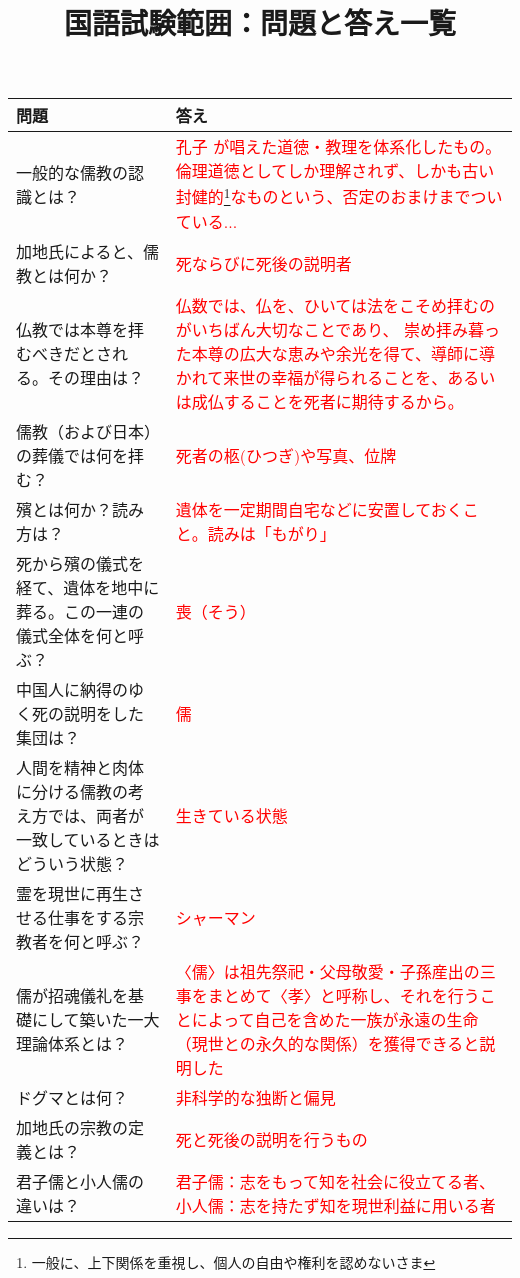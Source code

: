 \documentclass[a4paper,10pt]{article}
\title{国語試験範囲：問題と答え一覧}
\date{}
\begin{document}
\maketitle

\begin{longtable}{|p{}|p{}|}
\hline
\textbf{問題} & \textbf{答え} \\ \hline
一般的な儒教の認識とは？ & \textcolor{red}{孔子 が唱えた道徳・教理を体系化したもの。倫理道徳としてしか理解されず、しかも古い封健的\footnote{一般に、上下関係を重視し、個人の自由や権利を認めないさま}なものという、否定のおまけまでついている...} \\ \hline
加地氏によると、儒教とは何か？ & \textcolor{red}{死ならびに死後の説明者} \\ \hline
仏教では本尊を拝むべきだとされる。その理由は？ & \textcolor{red}{仏数では、仏を、ひいては法をこそめ拝むのがいちばん大切なことであり、
崇め拝み暮った本尊の広大な恵みや余光を得て、導師に導かれて来世の幸福が得られることを、あるいは成仏することを死者に期待するから。} \\ \hline
儒教（および日本）の葬儀では何を拝む？ & \textcolor{red}{死者の柩(ひつぎ)や写真、位牌} \\ \hline
殯とは何か？読み方は？ & \textcolor{red}{遺体を一定期間自宅などに安置しておくこと。読みは「もがり」} \\ \hline
死から殯の儀式を経て、遺体を地中に葬る。この一連の儀式全体を何と呼ぶ？ & \textcolor{red}{喪（そう）} \\ \hline
中国人に納得のゆく死の説明をした集団は？ & \textcolor{red}{儒} \\ \hline
人間を精神と肉体に分ける儒教の考え方では、両者が一致しているときはどういう状態？ & \textcolor{red}{生きている状態} \\ \hline
霊を現世に再生させる仕事をする宗教者を何と呼ぶ？ & \textcolor{red}{シャーマン} \\ \hline
儒が招魂儀礼を基礎にして築いた一大理論体系とは？ & \textcolor{red}{〈儒〉は祖先祭祀・父母敬愛・子孫産出の三事をまとめて〈孝〉と呼称し、それを行うことによって自己を含めた一族が永遠の生命（現世との永久的な関係）を獲得できると説明した} \\ \hline
ドグマとは何？ & \textcolor{red}{非科学的な独断と偏見} \\ \hline
加地氏の宗教の定義とは？ & \textcolor{red}{死と死後の説明を行うもの} \\ \hline
君子儒と小人儒の違いは？ & \textcolor{red}{君子儒：志をもって知を社会に役立てる者、小人儒：志を持たず知を現世利益に用いる者} \\ \hline

\end{longtable}
\end{document}
